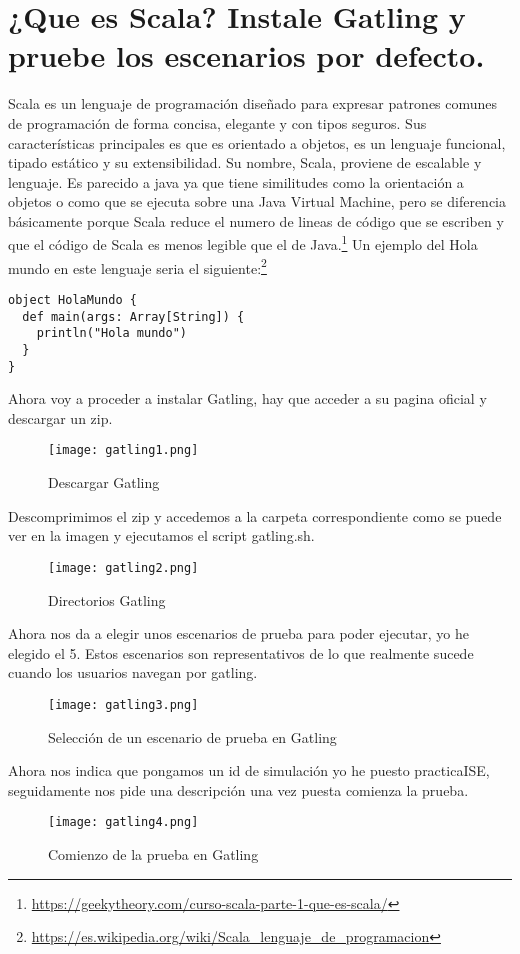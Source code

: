 \section{¿Que es Scala? Instale Gatling y pruebe los escenarios por defecto.}
Scala es un lenguaje de programación diseñado para expresar patrones comunes de programación de forma concisa, elegante y con tipos seguros. Sus características principales es que es orientado a objetos, es un lenguaje funcional, tipado estático y su extensibilidad. Su nombre, Scala, proviene de escalable y lenguaje. Es parecido a java ya que tiene similitudes como la orientación a objetos o como que se ejecuta sobre una Java Virtual Machine, pero se diferencia básicamente porque Scala reduce el numero de lineas de código que se escriben y que el código de Scala es menos legible que el de Java.\footnote{\url{https://geekytheory.com/curso-scala-parte-1-que-es-scala/}} Un ejemplo del Hola mundo en este lenguaje seria el siguiente:\footnote{\url{https://es.wikipedia.org/wiki/Scala_lenguaje_de_programacion}}
\begin{verbatim}
object HolaMundo {
  def main(args: Array[String]) {
    println("Hola mundo")
  }
}
\end{verbatim}
Ahora voy a proceder a instalar Gatling, hay que acceder a su pagina oficial y descargar un zip.
\begin{figure}[H] 
\centering
\texttt{[image: gatling1.png]}  
\label{figura19:}
\caption{Descargar Gatling}
\end{figure}
Descomprimimos el zip y accedemos a la carpeta correspondiente como se puede ver en la imagen y ejecutamos el script gatling.sh.
\begin{figure}[H] 
\centering
\texttt{[image: gatling2.png]}  
\label{figura20:}
\caption{Directorios Gatling}
\end{figure}
Ahora nos da a elegir unos escenarios de prueba para poder ejecutar, yo he elegido el 5. Estos escenarios son representativos de lo que realmente sucede cuando los usuarios navegan por gatling.
\begin{figure}[H] 
\centering
\texttt{[image: gatling3.png]}  
\label{figura21:}
\caption{Selección de un escenario de prueba en Gatling}
\end{figure}
Ahora nos indica que pongamos un id de simulación yo he puesto practicaISE, seguidamente nos pide una descripción una vez puesta comienza la prueba.
\begin{figure}[H] 
\centering
\texttt{[image: gatling4.png]}  
\label{figura22:}
\caption{Comienzo de la prueba en Gatling}
\end{figure}
